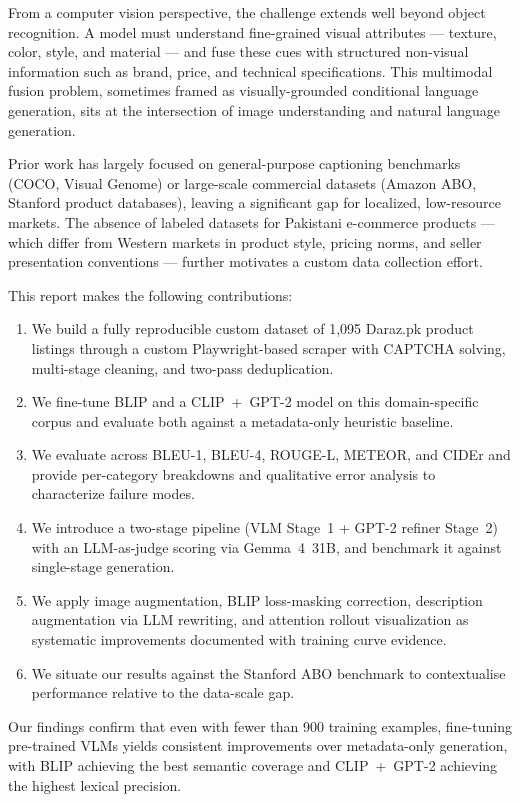 \documentclass[12pt,a4paper]{article}
\begin{document}
From a computer vision perspective, the challenge extends well beyond object recognition.
A model must understand fine-grained visual attributes --- texture, color, style, and
material --- and fuse these cues with structured non-visual information such as brand,
price, and technical specifications. This multimodal fusion problem, sometimes framed
as visually-grounded conditional language generation, sits at the intersection of image
understanding and natural language generation.

Prior work has largely focused on general-purpose captioning benchmarks (COCO, Visual
Genome) or large-scale commercial datasets (Amazon ABO, Stanford product databases),
leaving a significant gap for localized, low-resource markets. The absence of labeled
datasets for Pakistani e-commerce products --- which differ from Western markets in
product style, pricing norms, and seller presentation conventions --- further motivates
a custom data collection effort.

This report makes the following contributions:
\begin{enumerate}[noitemsep]
  \item We build a fully reproducible custom dataset of 1,095 Daraz.pk product listings
        through a custom Playwright-based scraper with CAPTCHA solving, multi-stage
        cleaning, and two-pass deduplication.
  \item We fine-tune BLIP and a CLIP~+~GPT-2 model on this domain-specific corpus
        and evaluate both against a metadata-only heuristic baseline.
  \item We evaluate across BLEU-1, BLEU-4, ROUGE-L, METEOR, and CIDEr and provide
        per-category breakdowns and qualitative error analysis to characterize failure modes.
  \item We introduce a two-stage pipeline (VLM Stage~1 + GPT-2 refiner Stage~2) with
        an LLM-as-judge scoring via Gemma~4~31B, and benchmark it against single-stage
        generation.
  \item We apply image augmentation, BLIP loss-masking correction, description
        augmentation via LLM rewriting, and attention rollout visualization as
        systematic improvements documented with training curve evidence.
  \item We situate our results against the Stanford ABO benchmark to contextualise
        performance relative to the data-scale gap.
\end{enumerate}

Our findings confirm that even with fewer than 900 training examples, fine-tuning
pre-trained VLMs yields consistent improvements over metadata-only generation, with
BLIP achieving the best semantic coverage and CLIP~+~GPT-2 achieving the highest
lexical precision.
\end{document}
